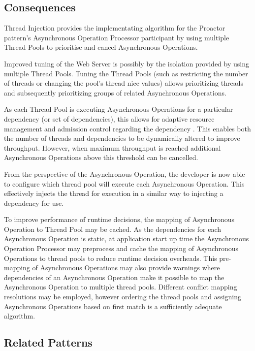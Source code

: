 \documentclass[prodmode]{style/acmlarge}
\begin{document}
\subsection{Consequences}

Thread Injection provides the implementating algorithm for the Proactor
pattern's Asynchronous Operation Processor participant by using multiple Thread
Pools to prioritise and cancel Asynchronous Operations.

Improved tuning of the Web Server is possibly by the isolation provided by using
multiple Thread Pools.  Tuning the Thread Pools (such as restricting the number
of threads or changing the pool's thread nice values) allows prioritizing
threads and subsequently prioritizing groups of related Asynchronous Operations.

As each Thread Pool is executing Asynchronous Operations for a particular
dependency (or set of dependencies), this allows for adaptive resource
management and admission control regarding the dependency \cite{seda}.  This
enables both the number of threads and dependencies to be dynamically altered to
improve throughput.  However, when maximum throughput is reached additional
Asynchronous Operations above this threshold can be cancelled.

From the perspective of the Asynchronous Operation, the developer is now able to
configure which thread pool will execute each Asynchronous Operation.  This
effectively injects the thread for execution in a similar way to injecting a
dependency for use.

To improve performance of runtime decisions, the mapping of Asynchronous
Operation to Thread Pool may be cached.  As the dependencies for each
Asynchronous Operation is static, at application start up time the Asynchronous
Operation Processor may preprocess and cache the mapping of Asynchronous
Operations to thread pools to reduce runtime decision overheads.  This
pre-mapping of Asynchronous Operations may also provide warnings where
dependencies of an Asynchronous Operation make it possible to map the
Asynchronous Operation to multiple thread pools.  Different conflict mapping
resolutions may be employed, however ordering the thread pools and assigning
Asynchronous Operations based on first match is a sufficiently adequate
algorithm.


\subsection{Related Patterns}
\end{document}
